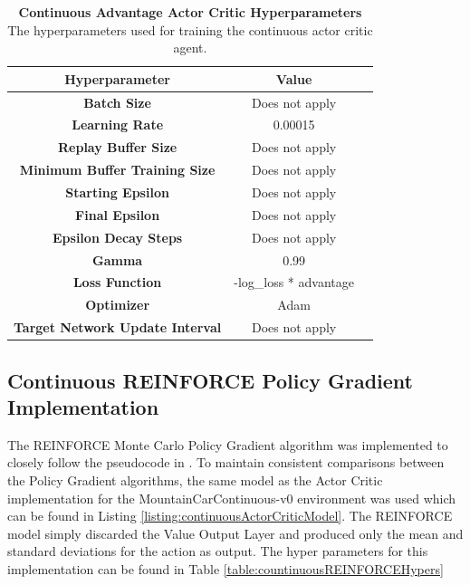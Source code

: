 \documentclass[conference]{IEEEtran}
\begin{document}
\begin{table}[htbp]
    \caption{\textbf{Continuous Advantage Actor Critic Hyperparameters}  The hyperparameters used for training the continuous actor critic agent.}
\begin{center}
\begin{tabular}{|c|c|c|}
\hline
\textbf{Hyperparameter} & \textbf{Value} \\
\hline
\textbf{Batch Size} & Does not apply \\
\hline
\textbf{Learning Rate} & 0.00015 \\
\hline
\textbf{Replay Buffer Size} & Does not apply \\
\hline
\textbf{Minimum Buffer Training Size} & Does not apply \\
\hline
\textbf{Starting Epsilon} & Does not apply \\
\hline
\textbf{Final Epsilon} & Does not apply \\
\hline
\textbf{Epsilon Decay Steps} & Does not apply \\
\hline
\textbf{Gamma} & 0.99\\
\hline
\textbf{Loss Function} &  -log\_loss * advantage \\
\hline
\textbf{Optimizer} & Adam \\
\hline
\textbf{Target Network Update Interval} & Does not apply \\
\hline
\end{tabular}
\label{table:continuousActorCriticHypers}
\end{center}
\end{table}

\subsection{Continuous REINFORCE Policy Gradient Implementation}
The REINFORCE Monte Carlo Policy Gradient algorithm was implemented to closely follow the pseudocode in \cite{ReinforcementLearningBook}. To maintain consistent comparisons between the Policy Gradient algorithms, the same model as the Actor Critic implementation for the MountainCarContinuous-v0 environment was used which can be found in Listing \ref{listing:continuousActorCriticModel}. The REINFORCE model simply discarded the Value Output Layer and produced only the mean and standard deviations for the action as output. 
The hyper parameters for this implementation can be found in Table \ref{table:countinuousREINFORCEHypers} 
\end{document}
